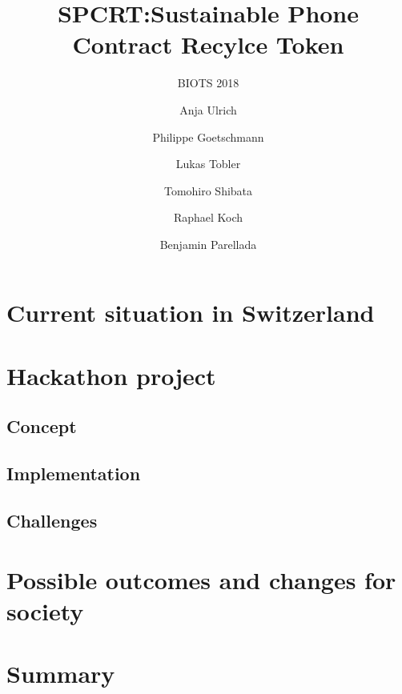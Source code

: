 \documentclass[11pt,twocolumn]{scrartcl}
\title{SPCRT:\@ Sustainable Phone Contract Recylce Token}
\subtitle{BIOTS 2018}
\author{%
    Anja Ulrich
    \and
    Philippe Goetschmann
    \and
    Lukas Tobler
    \and
    Tomohiro Shibata
    \and
    Raphael Koch
    \and
    Benjamin Parellada
}
\date{}
\begin{document}
\maketitle

\begin{abstract}
    \blindtext
\end{abstract}

\section{Current situation in Switzerland}
    \blindtext
    \blindtext
    \blindtext

\section{Hackathon project}
\subsection{Concept}
    \blindtext
\subsection{Implementation}
    \blindtext
\subsection{Challenges}
    \blindtext

\section{Possible outcomes and changes for society}
    \blindtext
    \blindtext
    \blindtext

\section{Summary}
    \blindtext
\end{document}
